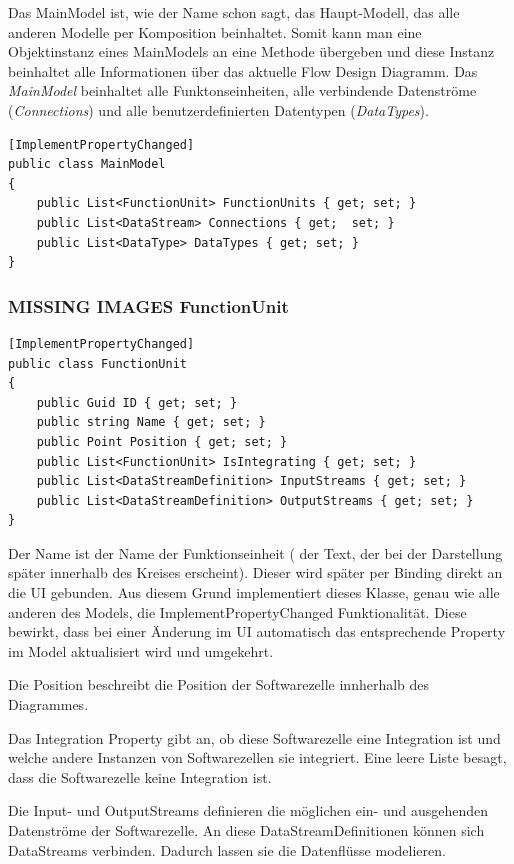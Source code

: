 Das MainModel ist, wie der Name schon sagt, das Haupt-Modell, das alle
anderen Modelle per Komposition beinhaltet. Somit kann man eine Objektinstanz
eines MainModels an eine Methode übergeben und diese Instanz beinhaltet alle
Informationen über das aktuelle Flow Design Diagramm. 
Das \textit{MainModel} beinhaltet alle Funktonseinheiten, alle verbindende
Datenströme (\textit{Connections}) und alle benutzerdefinierten Datentypen (\textit{DataTypes}).

\begin{verbatim}
[ImplementPropertyChanged]
public class MainModel
{
	public List<FunctionUnit> FunctionUnits { get; set; }
	public List<DataStream> Connections { get;  set; }
	public List<DataType> DataTypes { get; set; } 
}
\end{verbatim}

\subsubsection{{\bfseries\sffamily MISSING IMAGES} FunctionUnit}


\begin{verbatim}
[ImplementPropertyChanged]
public class FunctionUnit
{
	public Guid ID { get; set; }
	public string Name { get; set; }
	public Point Position { get; set; }
	public List<FunctionUnit> IsIntegrating { get; set; }
	public List<DataStreamDefinition> InputStreams { get; set; }
	public List<DataStreamDefinition> OutputStreams { get; set; }
}
\end{verbatim}

Der Name ist der Name der Funktionseinheit ( der Text, der bei der
Darstellung später innerhalb des Kreises erscheint). Dieser wird später per Binding
direkt an die UI gebunden. Aus diesem Grund implementiert dieses Klasse,
genau wie alle anderen des Models, die ImplementPropertyChanged
Funktionalität. Diese bewirkt, dass bei einer Änderung im UI automatisch das
entsprechende Property im Model aktualisiert wird und umgekehrt.

Die Position beschreibt die Position der Softwarezelle innherhalb des
Diagrammes.  

Das Integration Property gibt an, ob diese Softwarezelle eine Integration
ist und welche andere Instanzen von Softwarezellen sie integriert.
Eine leere Liste besagt, dass die Softwarezelle keine Integration ist.

Die Input- und OutputStreams definieren die möglichen ein- und ausgehenden
Datenströme der Softwarezelle. An diese DataStreamDefinitionen können sich DataStreams
verbinden. Dadurch lassen sie die Datenflüsse modelieren.



